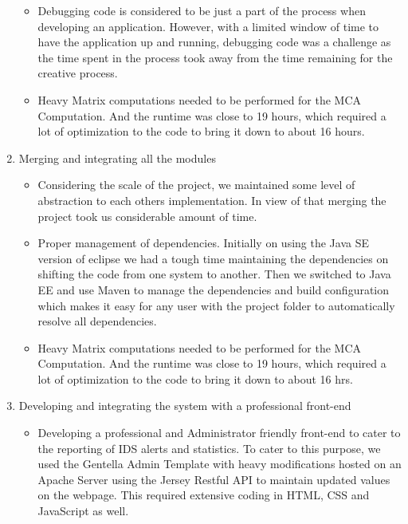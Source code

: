 \documentclass[conference]{sig-alternate-05-2015}
\begin{document}
\begin{enumerate}
\begin{itemize}
    \item Debugging code is considered to be just a part of the process when developing an application. However, with a limited window of time to have the application up and running, debugging code was a challenge as the time spent in the process took away from the time remaining for the creative process.
    \item Heavy Matrix computations needed to be performed for the MCA Computation. And the runtime was close to 19 hours, which required a lot of optimization to the code to bring it down to about 16 hours.
  \end{itemize}
  \item Merging and integrating all the modules
  \begin{itemize}
    \item Considering the scale of the project, we maintained some level of abstraction to each others implementation. In view of that merging the project took us considerable amount of time. 
    \item Proper management of dependencies. Initially on using the Java SE version of eclipse we had a tough time maintaining the dependencies on shifting the code from one system to another. Then we switched to Java EE and use Maven \cite{maven} to manage the dependencies and build configuration which makes it easy for any user with the project folder to automatically resolve all dependencies.
    \item Heavy Matrix computations needed to be performed for the MCA Computation. And the runtime was close to 19 hours, which required a lot of optimization to the code to bring it down to about 16 hrs.
  \end{itemize}
  \item Developing and integrating the system with a professional front-end
  \begin{itemize}
    \item Developing a professional and Administrator friendly front-end to cater to the reporting of IDS alerts and statistics. To cater to this purpose, we used the Gentella Admin Template \cite{template} with heavy modifications hosted on an Apache Server using the Jersey Restful API to maintain updated values on the webpage. This required extensive coding in HTML, CSS and JavaScript as well. 
  \end{itemize}
\end{enumerate}
\end{document}
